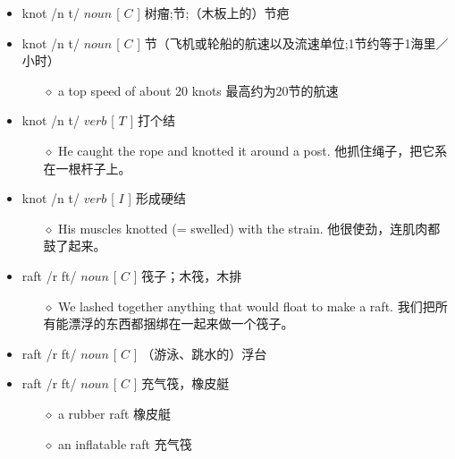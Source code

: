 \documentclass[a4paper,top=2.5cm,buttom=2.5cm10.5pt]{book}
\begin{document}
\begin{itemize}
\item knot /n \textturnscripta t/ $ noun $ [  $ C $  ] 树瘤;节;（木板上的）节疤
\end{itemize}
\begin{itemize}
\item knot /n \textturnscripta t/ $ noun $ [  $ C $  ] 节（飞机或轮船的航速以及流速单位;1节约等于1海里／小时）
\begin{itemize}
\item[$\diamond$] a top speed of about 20 knots
最高约为20节的航速
\end{itemize}
\end{itemize}
\begin{itemize}
\item knot /n \textturnscripta t/ $ verb $ [  $ T $  ] 打个结
\begin{itemize}
\item[$\diamond$] He caught the rope and knotted it around a post.
他抓住绳子，把它系在一根杆子上。
\end{itemize}
\end{itemize}
\begin{itemize}
\item knot /n \textturnscripta t/ $ verb $ [  $ I $  ] 形成硬结
\begin{itemize}
\item[$\diamond$] His muscles knotted (= swelled) with the strain.
他很使劲，连肌肉都鼓了起来。
\end{itemize}
\end{itemize}
\begin{itemize}
\item raft /r \textscripta  \textlengthmark ft/ $ noun $ [  $ C $  ] 筏子；木筏，木排
\begin{itemize}
\item[$\diamond$] We lashed together anything that would float to make a raft.
我们把所有能漂浮的东西都捆绑在一起来做一个筏子。
\end{itemize}
\end{itemize}
\begin{itemize}
\item raft /r \textscripta  \textlengthmark ft/ $ noun $ [  $ C $  ] （游泳、跳水的）浮台
\end{itemize}
\begin{itemize}
\item raft /r \textscripta  \textlengthmark ft/ $ noun $ [  $ C $  ] 充气筏，橡皮艇
\begin{itemize}
\item[$\diamond$] a rubber raft
橡皮艇
\item[$\diamond$] an inflatable raft
充气筏
\end{itemize}
\end{itemize}
\end{document}
